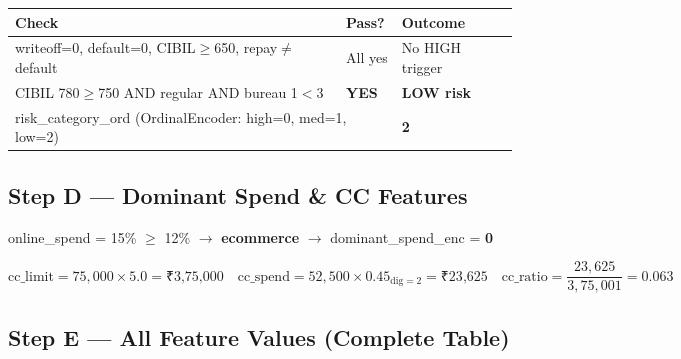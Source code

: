 \documentclass[12pt,a4paper]{article}
\begin{document}
\begin{tabular}{lll}
\toprule
\textbf{Check} & \textbf{Pass?} & \textbf{Outcome} \\
\midrule
writeoff=0, default=0, CIBIL$\geq$650, repay$\neq$default & All yes & No HIGH trigger \\
CIBIL 780$\geq$750 AND regular AND bureau 1$<$3 & \textcolor{okgreen}{\textbf{YES}} & \textbf{LOW risk} \\
\midrule
\multicolumn{2}{l}{risk\_category\_ord (OrdinalEncoder: high=0, med=1, low=2)} & \textbf{2} \\
\bottomrule
\end{tabular}

\subsection{Step D — Dominant Spend \& CC Features}

online\_spend = 15\% $\geq$ 12\% $\rightarrow$ \textbf{ecommerce} $\rightarrow$ dominant\_spend\_enc = \textbf{0}

\[
\text{cc\_limit} = 75{,}000\times5.0 = \text{₹3{,}75{,}000}
\quad
\text{cc\_spend} = 52{,}500\times0.45_{\text{dig}=2} = \text{₹23{,}625}
\quad
\text{cc\_ratio} = \frac{23{,}625}{3{,}75{,}001} = 0.063
\]

\subsection{Step E — All Feature Values (Complete Table)}
\end{document}
